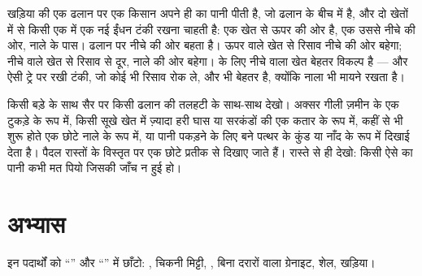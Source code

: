 \begin{example}[फ़ार्म के लिए एक नई ईंधन टंकी]\label{ex:g6:water-underground:tank}
खड़िया की एक  ढलान पर एक किसान अपने ही  का पानी पीती है, जो ढलान
के बीच में है, और दो खेतों में से किसी एक में एक नई ईंधन टंकी रखना चाहती है:
एक खेत  से ऊपर की ओर है, एक उससे नीचे की ओर, नाले के पास।  ढलान पर
नीचे की ओर बहता है। ऊपर वाले खेत से रिसाव नीचे  की ओर बहेगा; नीचे वाले
खेत से रिसाव  से दूर, नाले की ओर बहेगा।  के लिए नीचे वाला खेत बेहतर
विकल्प है --- और ऐसी ट्रे पर रखी टंकी, जो कोई भी रिसाव रोक ले, और भी बेहतर
है, क्योंकि नाला भी मायने रखता
है।
\end{example}

\begin{inthefield}[सोते पहचानना]
किसी बड़े के साथ सैर पर किसी ढलान की तलहटी के साथ-साथ देखो।  अक्सर गीली
ज़मीन के एक टुकड़े के रूप में, किसी सूखे खेत में ज़्यादा हरी घास या सरकंडों की एक
कतार के रूप में, कहीं से भी शुरू होते एक छोटे नाले के रूप में, या पानी पकड़ने
के लिए बने पत्थर के कुंड या नाँद के रूप में दिखाई देता है। पैदल रास्तों के
विस्तृत  पर  एक छोटे प्रतीक से दिखाए जाते हैं। रास्ते से ही देखो:
किसी ऐसे  का पानी कभी मत पियो जिसकी जाँच न हुई हो।
\end{inthefield}

\section{अभ्यास}

\begin{exercise}[$\star$]\label{exo:g6:water-underground:1}
इन पदार्थों को ``'' और ``'' में छाँटो: , चिकनी मिट्टी,
, बिना दरारों वाला ग्रेनाइट, शेल, खड़िया।
\end{exercise}

